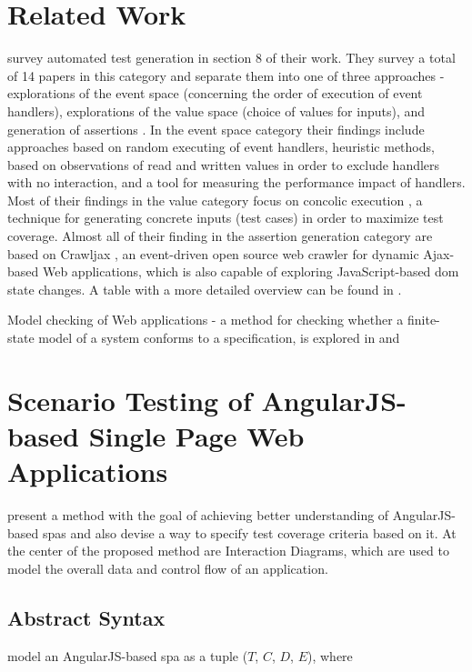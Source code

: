 \section{Related Work}
\textcite{andreasen2017survey} survey automated test generation in section 8 of their work\parencite[23-25]{andreasen2017survey}. They survey a total of 14 papers in this category and separate them into one of three approaches - explorations of the event space (concerning the order of execution of event handlers), explorations of the value space (choice of values for inputs), and generation of assertions \parencite{andreasen2017survey}. 
In the event space category their findings include 
approaches based on random executing of event handlers, heuristic methods, based on observations of read and written values in order to exclude handlers with no interaction, and a tool for measuring the performance impact of handlers. Most of their findings in the value category focus on concolic execution \parencite{godefroid2005dart}, a technique for generating concrete inputs (test cases) in order to maximize test coverage. Almost all of their finding in the assertion generation category are based on
Crawljax \parencite{crawljax2021Feb}, an event-driven open source web crawler for dynamic Ajax-based Web applications, which is also capable of exploring JavaScript-based \gls{dom} state changes.
A table with a more detailed overview can be found in \parencite[24]{andreasen2017survey}.

Model checking of Web applications - a method for checking whether a finite-state model of a system conforms to a specification, is explored in \parencite{zhang2019scenario} and \parencite{gao2019model}
\section{Scenario Testing of AngularJS-based Single Page Web Applications}
\textcite{zhang2019scenario} present a method with the goal of achieving better understanding of AngularJS-based \glspl{spa} and also devise a way to specify test coverage criteria based on it. At the center of the proposed method are Interaction Diagrams, which are used to model the overall data and control flow of an application.\parencite{zhang2019scenario}

\subsection{Abstract Syntax}
\textcite{zhang2019scenario} model an AngularJS-based \gls{spa} as a tuple ($T$, $C$, $D$, $E$), where

